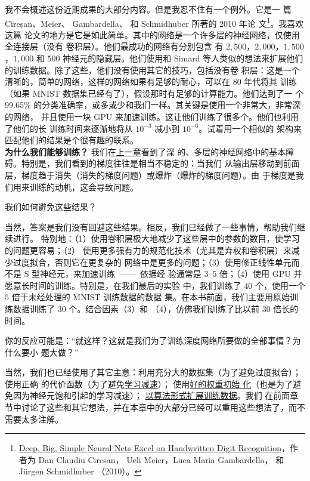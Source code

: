 我不会概述这份近期成果的大部分内容。但是我忍不住有一个例外。它是一
篇 Cireșan、Meier、 Gambardella、 和 Schmidhuber 所著的 2010 年论
文\footnote{\href{http://arxiv.org/abs/1003.0358}{Deep, Big, Simple Neural Nets
    Excel on Handwritten Digit Recognition}，作者为 Dan Claudiu Cireșan， Ueli
  Meier，Luca Maria Gambardella， 和 Jürgen Schmidhuber （2010）。}。我喜欢这篇
论文的地方是它是如此简单。其中的网络是一个许多层的神经网络，仅使用全连接层（没有
卷积层）。他们最成功的网络有分别包含
有 $2,500$，$2,000$，$1,500$，$1,000$ 和 $500$ 神经元的隐藏层。他们使用和 Simard
等人类似的想法来扩展他们的训练数据。除了这些，他们没有使用其它的技巧，包括没有卷
积层：这是一个清晰的，简单的网络，这样的网络如果有足够的耐心，可以在 80 年代将其
训练（如果 MNIST 数据集已经有了），假设那时有足够的计算能力。他们达到了一
个99.65\% 的分类准确率，或多或少和我们一样。其关键是使用一个非常大，非常深的网络，
并且使用一块 GPU 来加速训练。这让他们训练了很多个\epochs{}。他们也利用了他们的长
训练时间来逐渐地将\learningrate{}从 $10^{-3}$ 减小到 $10^{-6}$。试着用一个相似的
架构来匹配他们的结果是个很有趣的联系。\\

\textbf{为什么我们能够训练？} 我们在\hyperref[ch:WhyHardToTrain]{上一章}看到了深
的、多层的神经网络中的基本障碍。特别是，我们看到的梯度往往是相当不稳定的：当我们
从输出层移动到前面层，梯度趋于消失（消失的梯度问题）或爆炸（爆炸的梯度问题）。由
于梯度是我们用来训练的动机，这会导致问题。

我们如何避免这些结果？

当然，答案是我们没有回避这些结果。相反，我们已经做了一些事情，帮助我们继续进行。
特别地：（1）使用卷积层极大地减少了这些层中的参数的数目，使学习的问题更容易；（2）
使用更多强有力的规范化技术（尤其是弃权和卷积层）来减少过度拟合，否则它在更复杂的
网络中是更多的问题；（3）使用修正线性单元而不是 S 型神经元，来加速训练~——~依据经
验通常是 $3$--$5$ 倍；（4）使用 GPU 并愿意长时间的训练。特别是，在我们最后的实验
中，我们训练了 $40$ 个\epochs{}，使用一个 $5$ 倍于未经处理的 MNIST 训练数据的数据
集。在本书前面，我们主要用原始训练数据训练了 $30$ 个\epochs{}。结合因素（3）和
（4），仿佛我们训练了比以前 $30$ 倍长的时间。

你的反应可能是：“就这样？这就是我们为了训练深度网络所要做的全部事情？为什么要小
题大做？”

当然，我们也已经使用了其它主意：利用充分大的数据集（为了避免过度拟合）；使用正确
的代价函数（为了避免\hyperref[sec:the_cross-entropy_cost_function]{学习减速}）；
使用\hyperref[how_to_choose_a_neural_network's_hyper-parameters]{好的权重初始
  化}（也是为了避免因为神经元饱和引起的学习减速）；%
\hyperref[sec:other_techniques_for_regularization]{以算法形式扩展训练数据}。我们
在前面章节中讨论了这些和其它想法，并在本章中的大部分已经可以重用这些想法了，而不
需要太多注解。


